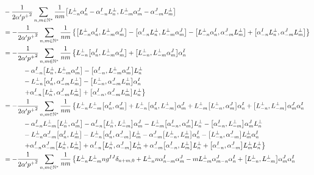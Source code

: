 \begin{align*}
    &-\frac{1}{2\alpha'{p^+}^2}\sum\limits_{n,m\in\mathbb N^\ast}\frac{1}{nm}\comm{L^\perp_{-n}\alpha^I_n-\alpha^I_{-n}L^\perp_n}{L^\perp_{-m}\alpha^J_m-\alpha^J_{-m}L^\perp_m}\\
    &=-\frac{1}{2\alpha'{p^+}^2}\sum\limits_{n,m\in\mathbb N^\ast}\frac{1}{nm}\left\{\comm{L^\perp_{-n}\alpha^I_n}{L^\perp_{-m}\alpha^J_m}-\comm{\alpha^I_{-n}L^\perp_n}{L^\perp_{-m}\alpha^J_m}-\comm{L^\perp_{-n}\alpha^I_n}{\alpha^J_{-m}L^\perp_m}+\comm{\alpha^I_{-n}L^\perp_n}{\alpha^J_{-m}L^\perp_m}\right\}\\
    &=-\frac{1}{2\alpha'{p^+}^2}\sum\limits_{n,m\in\mathbb N^\ast}\frac{1}{nm}\left\{L^\perp_{-n}\comm{\alpha^I_n}{L^\perp_{-m}\alpha^J_m}+\comm{L^\perp_{-n}}{L^\perp_{-m}\alpha^J_m}\alpha^I_n\right.\\
    &\quad\quad\quad-\alpha^I_{-n}\comm{L^\perp_n}{L^\perp_{-m}\alpha^J_m}-\comm{\alpha^I_{-n}}{L^\perp_{-m}\alpha^J_m}L^\perp_n\\
    &\quad\quad\quad-L^\perp_{-n}\comm{\alpha^I_n}{\alpha^J_{-m}L^\perp_m}-\comm{L^\perp_{-n}}{\alpha^J_{-m}L^\perp_m}\alpha^I_n\\
    &\quad\quad\quad\left.+\alpha^I_{-n}\comm{L^\perp_n}{\alpha^J_{-m}L^\perp_m}+\comm{\alpha^I_{-n}}{\alpha^J_{-m}L^\perp_m}L^\perp_n\right\}\\
    &=-\frac{1}{2\alpha'{p^+}^2}\sum\limits_{n,m\in\mathbb N^\ast}\frac{1}{nm}\left\{L^\perp_{-n}L^\perp_{-m}\comm{\alpha^I_n}{\alpha^J_m}+L^\perp_{-n}\comm{\alpha^I_n}{L^\perp_{-m}}\alpha^J_m+L^\perp_{-m}\comm{L^\perp_{-n}}{\alpha^J_m}\alpha^I_n+\comm{L^\perp_{-n}}{L^\perp_{-m}}\alpha^J_m\alpha^I_n\right.\\
    &\quad\quad\quad-\alpha^I_{-n}L^\perp_{-m}\comm{L^\perp_n}{\alpha^J_m}-\alpha^I_{-n}\comm{L^\perp_n}{L^\perp_{-m}}\alpha^J_m-L^\perp_{-m}\comm{\alpha^I_{-n}}{\alpha^J_m}L^\perp_n-\comm{\alpha^I_{-n}}{L^\perp_{-m}}\alpha^J_mL^\perp_n\\
    &\quad\quad\quad-L^\perp_{-n}\alpha^J_{-m}\comm{\alpha^I_n}{L^\perp_m}-L^\perp_{-n}\comm{\alpha^I_n}{\alpha^J_{-m}}L^\perp_m-\alpha^J_{-m}\comm{L^\perp_{-n}}{L^\perp_m}\alpha^I_n-\comm{L^\perp_{-n}}{\alpha^J_{-m}}L^\perp_m\alpha^I_n\\
    &\quad\quad\quad\left.+\alpha^I_{-n}\alpha^J_{-m}\comm{L^\perp_n}{L^\perp_m}+\alpha^I_{-n}\comm{L^\perp_n}{\alpha^J_{-m}}L^\perp_m+\alpha^J_{-m}\comm{\alpha^I_{-n}}{L^\perp_m}L^\perp_n+\comm{\alpha^I_{-n}}{\alpha^J_{-m}}L^\perp_mL^\perp_n\right\}\\
    &=-\frac{1}{2\alpha'{p^+}^2}\sum\limits_{n,m\in\mathbb N^\ast}\frac{1}{nm}\left\{L^\perp_{-n}L^\perp_{-m}ng^{IJ}\delta_{n+m,0}+L^\perp_{-n}n\alpha^I_{n-m}\alpha^J_m-mL^\perp_{-m}\alpha^J_{m-n}\alpha^I_n+\comm{L^\perp_{-n}}{L^\perp_{-m}}\alpha^J_m\alpha^I_n\right.\\

\end{align*}
